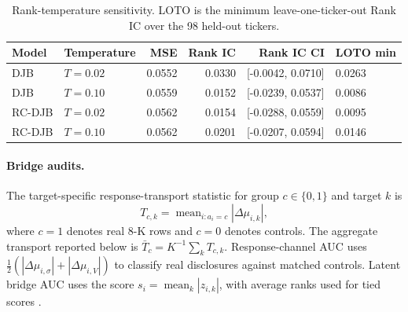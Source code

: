 \documentclass[10pt,letterpaper]{article}
\begin{document}
\begin{table}[H]
\centering
\caption{Rank-temperature sensitivity. LOTO is the minimum leave-one-ticker-out Rank IC over the
98 held-out tickers.}
\label{tab:temperature}
\small
\begin{tabular}{llrrrl}
\toprule
Model & Temperature & MSE & Rank IC & Rank IC CI & LOTO min \\
\midrule
DJB & \(T=0.02\) & 0.0552 & 0.0330 & [-0.0042, 0.0710] & 0.0263 \\
DJB & \(T=0.10\) & 0.0559 & 0.0152 & [-0.0239, 0.0537] & 0.0086 \\
RC-DJB & \(T=0.02\) & 0.0562 & 0.0154 & [-0.0288, 0.0559] & 0.0095 \\
RC-DJB & \(T=0.10\) & 0.0562 & 0.0201 & [-0.0207, 0.0594] & 0.0146 \\
\bottomrule
\end{tabular}
\end{table}

\paragraph{Bridge audits.}
The target-specific response-transport statistic for group \(c\in\{0,1\}\) and target \(k\) is
\begin{equation}
    T_{c,k}
    =
    \operatorname{mean}_{i:a_i=c}\left|\Delta\mu_{i,k}\right|,
\end{equation}
where \(c=1\) denotes real 8-K rows and \(c=0\) denotes controls. The aggregate transport reported
below is \(\bar{T}_c=K^{-1}\sum_k T_{c,k}\). Response-channel AUC uses
\(\frac{1}{2}(|\Delta\mu_{i,\sigma}|+|\Delta\mu_{i,V}|)\) to classify real disclosures against
matched controls. Latent bridge AUC uses the score \(s_i=\operatorname{mean}_k|z_{i,k}|\), with
average ranks used for tied scores \citep{hanley1982meaning}.
\end{document}
